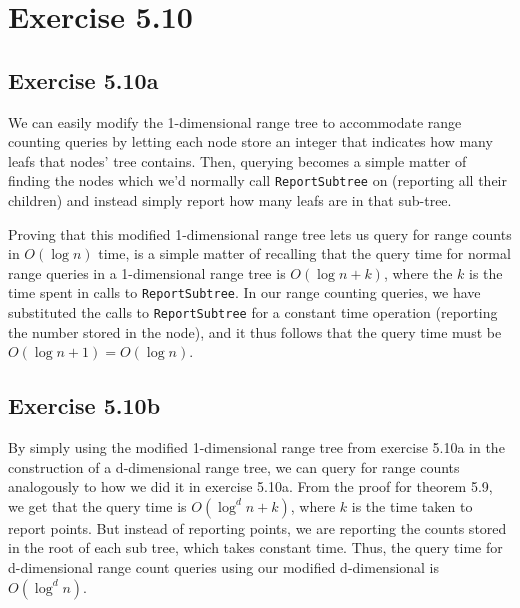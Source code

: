 \documentclass[11pt,a4paper]{article}
\begin{document}
\section{Exercise 5.10}

\subsection{Exercise 5.10a}

We can easily modify the 1-dimensional range tree to accommodate range
counting queries by letting each node store an integer that indicates
how many leafs that nodes' tree contains. Then, querying becomes a
simple matter of finding the nodes which we'd normally call
\verb+ReportSubtree+ on (reporting all their children) and instead
simply report how many leafs are in that sub-tree.

Proving that this modified 1-dimensional range tree lets us query for
range counts in $O(\log n)$ time, is a simple matter of recalling that
the query time for normal range queries in a 1-dimensional range tree
is $O(\log n + k)$, where the $k$ is the time spent in calls to
\verb+ReportSubtree+. In our range counting queries, we have
substituted the calls to \verb+ReportSubtree+ for a constant time
operation (reporting the number stored in the node), and it thus
follows that the query time must be $O(\log n + 1) = O(\log n)$.

\subsection{Exercise 5.10b}

By simply using the modified 1-dimensional range tree from exercise
5.10a in the construction of a d-dimensional range tree, we can query
for range counts analogously to how we did it in exercise 5.10a. From
the proof for theorem 5.9, we get that the query time is $O(\log^d n +
k)$, where $k$ is the time taken to report points. But instead of
reporting points, we are reporting the counts stored in the root of
each sub tree, which takes constant time. Thus, the query time for
d-dimensional range count queries using our modified d-dimensional is
$O(\log^d n)$.
\end{document}
